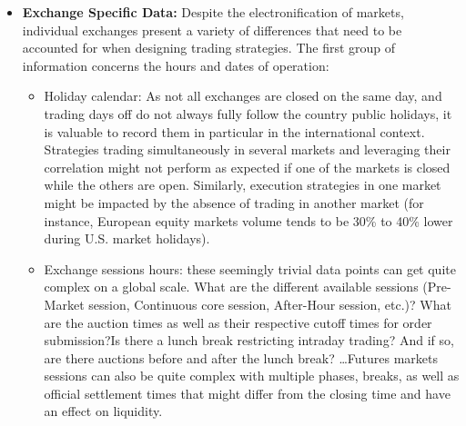 \begin{itemize}
Maintaining a table of the quotation currency per instrument is also necessary in order to be able to aggregate positions at a portfolio level. Some exchanges allow the quotation of prices in currencies different from the one of the country in which the exchange is located.\footnote{For example, Jardine Matheson Holdings quotes in USD on the Singapore exchange while most of the other securities quote in Singapore Dollars.} Additionally, the Quote Factor associated with the quotation currency data needs to be stored. To account for the wide range of currency values and preserve pricing precision, market data providers might be publishing FX rates with a factor of 100 or 1000. Hence, to convert prices to USD one needs to multiply by the quote factor: usd price $=$ local price $\cdot$ fx $\cdot$ quote factor. Similarly, some exchanges quote prices in cents, and the associated quotation currency is reflected with a small cap letter: GBP/GBp, ZAR/ZAr, ILS/ILs, \dots).


\item \textbf{Exchange Specific Data:}  Despite the electronification of markets, individual exchanges present a variety of differences that need to be accounted for when designing trading strategies. The first group of information concerns the hours and dates of operation:
\begin{itemize}
\item Holiday calendar: As not all exchanges are closed on the same day, and trading days off do not always fully follow the country public holidays, it is valuable to record them in particular in the international context. Strategies trading simultaneously in several markets and leveraging their correlation might not perform as expected if one of the markets is closed while the others are open. Similarly, execution strategies in one market might be impacted by the absence of trading in another market (for instance, European equity markets volume tends to be 30\% to 40\% lower during U.S. market holidays).

\item Exchange sessions hours: these seemingly trivial data points can get quite complex on a global scale. What are the different available sessions (Pre-Market session, Continuous core session, After-Hour session, etc.)? What are the auction times as well as their respective cutoff times for order submission?Is there a lunch break restricting intraday trading? And if so, are there auctions before and after the lunch break? \dots Futures markets sessions can also be quite complex with multiple phases, breaks, as well as official settlement times that might differ from the closing time and have an effect on liquidity.



\end{itemize}
\end{itemize}
